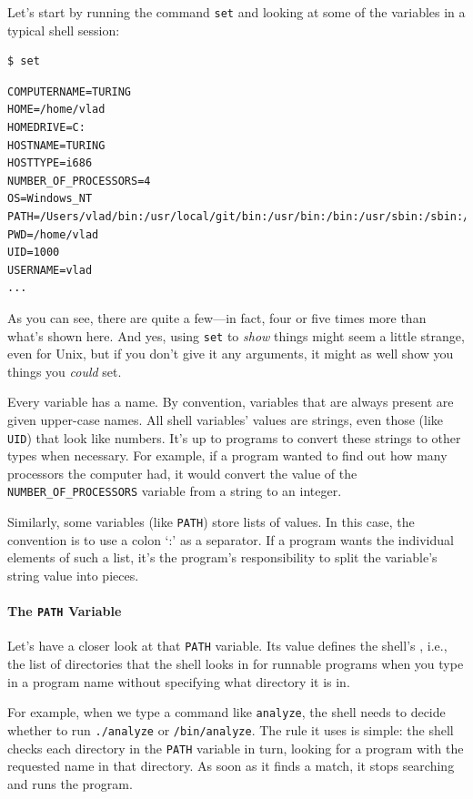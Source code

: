 \documentclass{book}
\begin{document}
Let's start by running the command \texttt{set} and looking at some of
the variables in a typical shell session:

\begin{verbatim}
$ set
\end{verbatim}

\begin{verbatim}
COMPUTERNAME=TURING
HOME=/home/vlad
HOMEDRIVE=C:
HOSTNAME=TURING
HOSTTYPE=i686
NUMBER_OF_PROCESSORS=4
OS=Windows_NT
PATH=/Users/vlad/bin:/usr/local/git/bin:/usr/bin:/bin:/usr/sbin:/sbin:/usr/local/bin
PWD=/home/vlad
UID=1000
USERNAME=vlad
...
\end{verbatim}

As you can see, there are quite a few---in fact, four or five times more
than what's shown here. And yes, using \texttt{set} to \emph{show}
things might seem a little strange, even for Unix, but if you don't give
it any arguments, it might as well show you things you \emph{could} set.

Every variable has a name. By convention, variables that are always
present are given upper-case names. All shell variables' values are
strings, even those (like \texttt{UID}) that look like numbers. It's up
to programs to convert these strings to other types when necessary. For
example, if a program wanted to find out how many processors the
computer had, it would convert the value of the
\texttt{NUMBER\_OF\_PROCESSORS} variable from a string to an integer.

Similarly, some variables (like \texttt{PATH}) store lists of values. In
this case, the convention is to use a colon `:' as a separator. If a
program wants the individual elements of such a list, it's the program's
responsibility to split the variable's string value into pieces.

\mbox{}\paragraph{The \texttt{PATH} Variable}

Let's have a closer look at that \texttt{PATH} variable. Its value
defines the shell's , i.e., the
list of directories that the shell looks in for runnable programs when
you type in a program name without specifying what directory it is in.

For example, when we type a command like \texttt{analyze}, the shell
needs to decide whether to run \texttt{./analyze} or
\texttt{/bin/analyze}. The rule it uses is simple: the shell checks each
directory in the \texttt{PATH} variable in turn, looking for a program
with the requested name in that directory. As soon as it finds a match,
it stops searching and runs the program.
\end{document}
